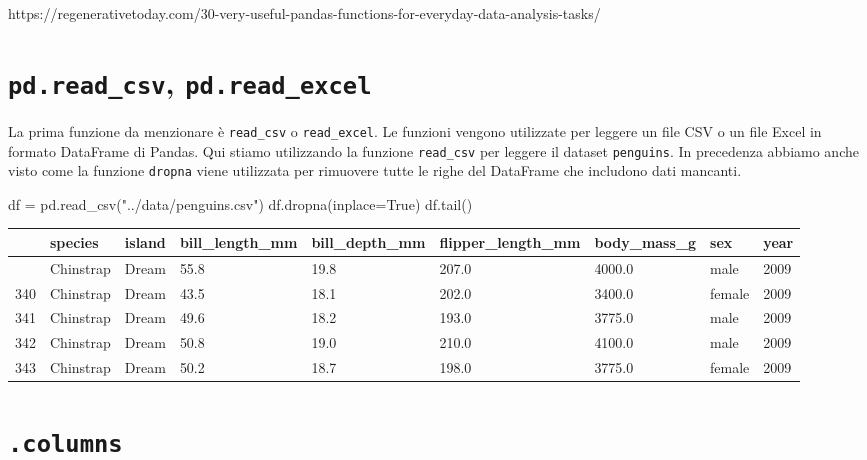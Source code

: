 \documentclass[
  letterpaper,
  krantz2]{{[}./krantz{]}}
\newenvironment{Shaded}{\begin{snugshade}}{\end{snugshade}}
\newcommand{\NormalTok}[1]{\textcolor[rgb]{0.00,0.23,0.31}{#1}}
\newcommand{\OperatorTok}[1]{\textcolor[rgb]{0.37,0.37,0.37}{#1}}
\newcommand{\StringTok}[1]{\textcolor[rgb]{0.13,0.47,0.30}{#1}}
\newcommand{\VariableTok}[1]{\textcolor[rgb]{0.07,0.07,0.07}{#1}}
\begin{document}
https://regenerativetoday.com/30-very-useful-pandas-functions-for-everyday-data-analysis-tasks/

\section{\texorpdfstring{\texttt{pd.read\_csv},
\texttt{pd.read\_excel}}{pd.read\_csv, pd.read\_excel}}\label{pd.read_csv-pd.read_excel}

La prima funzione da menzionare è \texttt{read\_csv} o
\texttt{read\_excel}. Le funzioni vengono utilizzate per leggere un file
CSV o un file Excel in formato DataFrame di Pandas. Qui stiamo
utilizzando la funzione \texttt{read\_csv} per leggere il dataset
\texttt{penguins}. In precedenza abbiamo anche visto come la funzione
\texttt{dropna} viene utilizzata per rimuovere tutte le righe del
DataFrame che includono dati mancanti.

\begin{Shaded}
\begin{Highlighting}[]
\NormalTok{df }\OperatorTok{=}\NormalTok{ pd.read\_csv(}\StringTok{"../data/penguins.csv"}\NormalTok{)}
\NormalTok{df.dropna(inplace}\OperatorTok{=}\VariableTok{True}\NormalTok{)}
\NormalTok{df.tail()}
\end{Highlighting}
\end{Shaded}

\begin{longtable}[]{@{}lllllllll@{}}
\toprule\noalign{}
& species & island & bill\_length\_mm & bill\_depth\_mm &
flipper\_length\_mm & body\_mass\_g & sex & year \\
\midrule\noalign{}
\endhead
\bottomrule\noalign{}
\endlastfoot
339 & Chinstrap & Dream & 55.8 & 19.8 & 207.0 & 4000.0 & male & 2009 \\
340 & Chinstrap & Dream & 43.5 & 18.1 & 202.0 & 3400.0 & female &
2009 \\
341 & Chinstrap & Dream & 49.6 & 18.2 & 193.0 & 3775.0 & male & 2009 \\
342 & Chinstrap & Dream & 50.8 & 19.0 & 210.0 & 4100.0 & male & 2009 \\
343 & Chinstrap & Dream & 50.2 & 18.7 & 198.0 & 3775.0 & female &
2009 \\
\end{longtable}

\section{\texorpdfstring{\texttt{.columns}}{.columns}}\label{columns}
\end{document}
